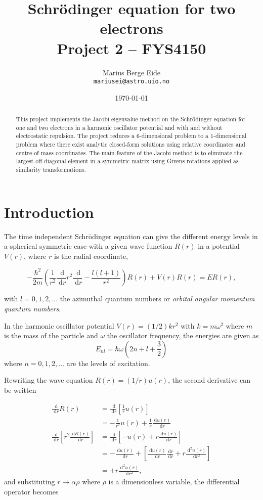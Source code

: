 \documentclass[a4paper,11pt]{article}
\date{\today}
\title{Schr\"{o}dinger equation for two electrons\\ \small{Project 2 -- FYS4150}}
\author{Marius Berge Eide \\
\texttt{mariusei@astro.uio.no}}
\newcommand{\diff}{\ensuremath{\; \text{d}}}
\begin{document}
\onecolumn
\maketitle{}

\begin{abstract}
    This project implements the Jacobi eigenvalue method on the Schr\"{o}dinger equation for one and two electrons in a harmonic oscillator potential and with and without electrostatic repulsion. The project reduces a 6-dimensional problem to a 1-dimensional problem where there exist analytic closed-form solutions using relative coordinates and centre-of-mass coordinates. The main feature of the Jacobi method is to eliminate the largest off-diagonal element in a symmetric matrix using Givens rotations applied as similarity transformations.
\end{abstract}

\section{Introduction}
The time independent Schr\"{o}dinger equation can give the different energy levels in a spherical symmetric case with a given wave function $R(r)$ in a potential $V(r)$, where $r$ is the radial coordinate,

\begin{equation}
    -\frac{\hbar^2}{2m} \left( \frac{1}{r^2} \frac{\diff}{\diff r} r^2 \frac{\diff}{\diff r} - \frac{l\left( l+1 \right)}{r^2}  \right) R(r) + V(r) R(r) = ER(r),
    \label{eq:schrodinger}
\end{equation}

with $l=0,1,2,\dots$ the azimuthal quantum numbers or \textit{orbital angular momentum quantum numbers}.

In the harmonic oscillator potential $V(r) = (1/2)kr^2$ with $k = m \omega^2$ where $m$ is the mass of the particle and $\omega$ the oscillator frequency, the energies are given as
\begin{equation}
    E_{nl} = \hbar \omega \left( 2n + l + \frac{3}{2} \right)
    \label{eq:energies}
\end{equation}
where $n=0,1,2,\dots$ are the levels of excitation.

Rewriting the wave equation $R(r) = (1/r) u(r)$, the second derivative can be written 

\begin{align*}
    \frac{\diff}{\diff r} R(r) &= \frac{\diff}{\diff r} \left[ \frac{1}{r} u(r) \right] \\
    &= -\frac{1}{r^2}u(r) + \frac{1}{r} \frac{\diff u(r)}{\diff r} \\
    \frac{\diff}{\diff r} \left[ r^2 \frac{\diff R(r)}{\diff r} \right] 
    &= \frac{\diff}{\diff r} \left[ -u(r) + r \frac{\diff u(r)}{\diff r} \right] \\
    &= -\frac{\diff u(r)}{\diff r} + \left[ \frac{\diff u(r)}{\diff r} \frac{\diff r}{\diff r} + r \frac{\diff^2 u(r)}{\diff r^2} \right] \\
    &= +r \frac{\diff^2 u(r)}{\diff r^2},
\end{align*}
and substituting $r \to \alpha \rho$ where $\rho$ is a dimensionless variable, the differential operator becomes
\end{document}
